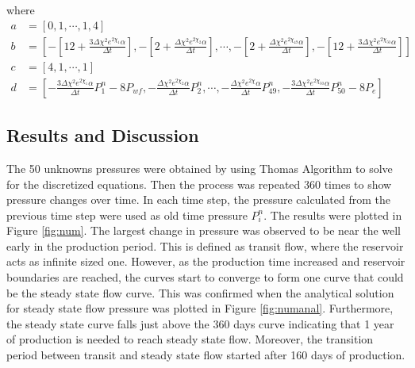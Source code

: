 \documentclass[12pt,letterpaper,titlepage]{article}
\begin{document}
where
\begin{align*}
a&=\left[0,1,\cdots,1,4\right]\\
b&=\left[-[12+\frac{3\Delta\chi^2 e^{2\chi_1}\alpha}{\Delta t}], -[2+\frac{\Delta\chi^2 e^{2\chi_2}\alpha}{\Delta t}],\cdots, -[2+\frac{\Delta\chi^2 e^{2\chi_{49}}\alpha}{\Delta t}], -[12+\frac{3\Delta\chi^2 e^{2\chi_{50}}\alpha}{\Delta t}]\right]\\
c&=[4,1,\cdots,1]\\
d&=\left[-\frac{3\Delta\chi^2 e^{2\chi_1}\alpha}{\Delta t}P_1^n-8  P_{wf}, -\frac{\Delta\chi^2e^{2\chi_2}\alpha}{\Delta t} P_2^n,\cdots, -\frac{\Delta\chi^2e^{2\chi_{}}\alpha}{\Delta t} P_{49}^n, -\frac{3\Delta\chi^2 e^{2\chi_{50}}\alpha}{\Delta t}P_{50}^n-8  P_{e}\right]
\end{align*}


\subsection{Results and Discussion}
The 50 unknowns pressures were obtained by using Thomas Algorithm to solve for the discretized equations. Then the process was repeated 360 times to show pressure changes over time. In each time step, the pressure calculated from the previous time step were used as old time pressure $P_i^n$. The results were plotted in Figure \ref{fig:num}. The largest change in pressure was observed to be near the well early in the production period. This is defined as transit flow, where the reservoir acts as infinite sized one. However, as the production time increased and reservoir boundaries are reached, the curves start to converge to form one curve that could be the steady state flow curve. This was confirmed when the analytical solution for steady state flow pressure was plotted in Figure \ref{fig:numanal}. Furthermore, the steady state curve falls just above the 360 days curve indicating that 1 year of production is needed to reach steady state flow. Moreover, the transition period between transit and steady state flow started after 160 days of production.
\end{document}
